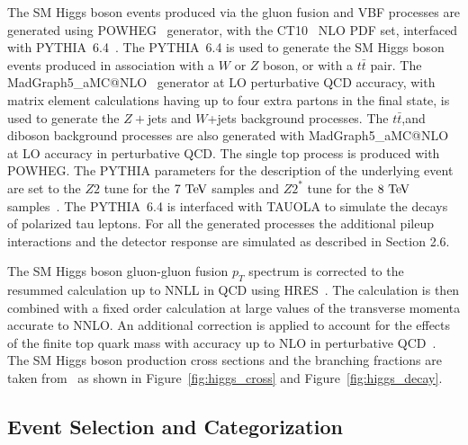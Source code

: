 The SM Higgs boson events produced via the gluon fusion and VBF processes are generated using POWHEG~\cite{POWHEG-V, POWHEG1, POWHEG2, POWHEG3} generator, with the CT10~\cite{Lai:2010vv} NLO PDF set, interfaced with PYTHIA~6.4~\cite{Sjostrand:2006za}. The PYTHIA~6.4 is used to generate the SM Higgs boson events produced in association with a $W$ or $Z$ boson, or with a $t\bar{t}$ pair. The MadGraph5\_aMC@NLO~\cite{Alwall:2007st} generator at LO perturbative QCD accuracy, with matrix element calculations having up to four extra partons in the final state, is used to generate the $Z+$jets and $W$+jets background processes. The $t\bar{t}$,and diboson background processes are also generated with MadGraph5\_aMC@NLO at LO accuracy in perturbative QCD. The single top process is produced with POWHEG. The PYTHIA parameters for the description of the underlying event are set to the $Z2$ tune for the $7~\mathrm{Te\kern -0.1em V}$ samples and $Z2^{*}$ tune for the $8~\mathrm{Te\kern -0.1em V}$ samples~\cite{CMS-PAS-FSQ-12-020}. The PYTHIA~6.4 is interfaced with TAUOLA to simulate the decays of polarized tau leptons. For all the generated processes the additional pileup interactions and the detector response are simulated as described in Section 2.6. 

The SM Higgs boson gluon-gluon fusion $p_{T}$ spectrum is corrected to the resummed calculation up to NNLL in QCD using HRES~\cite{deFlorian:2012mx}. The calculation is then combined with a fixed order calculation at large values of the transverse momenta accurate to NNLO. An additional correction is applied to account for the effects of the finite top quark mass with accuracy up to NLO in perturbative QCD~\cite{Grazzini:2013mca}. The SM Higgs boson production cross sections and the branching fractions are taken from~\cite{Dittmaier:2011ti,Dittmaier:2012vm,Heinemeyer:2013tqa} as shown in Figure~\ref{fig:higgs_cross} and Figure~\ref{fig:higgs_decay}.

\subsection{Event Selection and Categorization}

